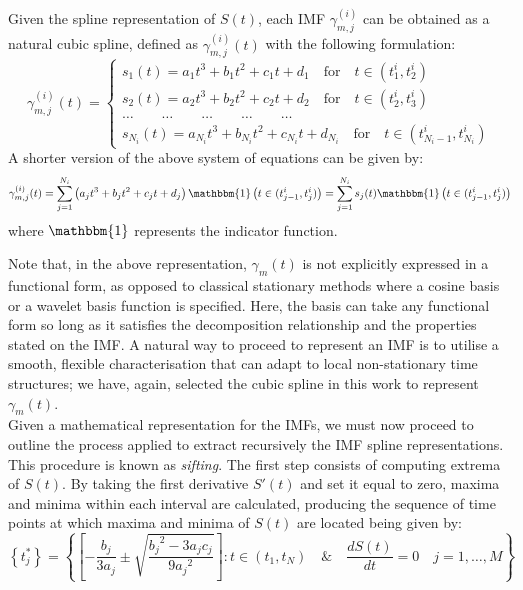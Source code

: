 Given the spline representation of $S(t)$, each IMF $\gamma_{m,j}^{(i)}$ can be obtained as a natural cubic spline, defined as $\gamma_{m,j}^{(i)}(t)$ with the following formulation:
\begin{equation*}
\gamma_{m,j}^{(i)}(t) = \begin{cases}
s_1(t) = a_1 t^3 + b_1 t^2 + c_1 t + d_1 \quad \mbox{for} \quad t \in (t_1^i, t_2^i) \\
s_2(t) = a_2 t^3 + b_2 t^2 + c_2 t + d_2 \quad \mbox{for} \quad t \in (t_2^i, t_3^i)\\
\dots \quad \quad \dots \quad \quad \dots \quad \quad \dots \quad \quad \dots\\
s_{N_i}(t) = a_{N_i} t^3 + b_{N_i} t^2 + c_{N_i} t + d_{N_i} \quad \mbox{for} \quad t \in (t_{{N_i}-1}^i, t_{N_i}^i)
\end{cases}
\end{equation*}
A shorter version of the above system of equations can be given by:
\begin{equation}
\gamma_{m,j}^{(i)}(t) = \sum_{j = 1}^{N_i} \left( a_j t^3 + b_j t^2 + c_j t + d_j \right){\mathbbm{1}} \left( t \in (t_{j-1}^i, t_j^i) \right) = \sum_{j = 1}^{N_i} s_j (t) {\mathbbm{1}} \left( t \in (t_{j-1}^i, t_j^i) \right)
\end{equation}
where $\mathbbm{1}$ represents the indicator function.

\noindent Note that, in the above representation, $\gamma_m(t)$ is not explicitly expressed in a functional form, as opposed to classical stationary methods where a cosine basis or a wavelet basis function is specified. Here, the basis can take any functional form so long as it satisfies the decomposition relationship and the properties stated on the IMF. A natural way to proceed to represent an IMF is to utilise a smooth, flexible characterisation that can adapt to local non-stationary time structures; we have, again, selected the cubic spline in this work to represent  $\gamma_m(t)$.\\
\noindent Given a mathematical representation for the IMFs, we must now proceed to outline the process applied to extract recursively the IMF spline representations. This procedure is known as \textit{sifting}. The first step consists of computing extrema of $S(t)$. By taking the first derivative $S'(t)$ and set it equal to zero, maxima and minima within each interval are calculated, producing the sequence of time points at which maxima and minima of $S(t)$ are located being given by:
\begin{equation}
\label{t_j}
\left\{ t^*_{j} \right\}  = \left\{ \left[ - \frac{b_j}{3 a_j} \pm \sqrt{\frac{{b_j}^2 - 3a_j c_j}{9 {a_j}^2}} \right] : t \in (t_1, t_N) \quad \& \quad \frac{d S(t)}{dt} = 0  \quad j= 1, \dots, M  \right\}
\end{equation}

